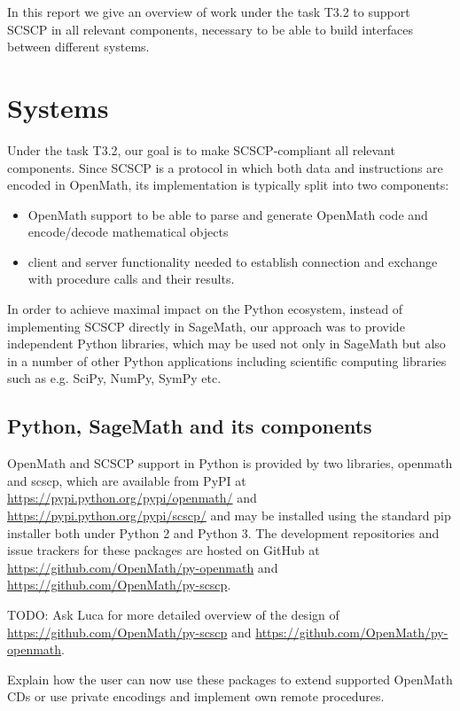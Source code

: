 \documentclass{deliverablereport}
\begin{document}
In this report we give an overview of work under the task T3.2 
to support SCSCP in all relevant components, necessary to be able
to build interfaces between different systems. 


\section{Systems}\label{systems}

Under the task T3.2, our goal is to make SCSCP-compliant all
relevant components. Since SCSCP is a protocol in which 
both data and instructions are encoded in OpenMath, its
implementation is typically split into two components: 
\begin{itemize}
\item OpenMath support to be able to parse and 
generate OpenMath code and encode/decode mathematical objects
\item client and server functionality needed to establish connection
and exchange with procedure calls and their results.
\end{itemize}

In order to achieve maximal impact on the Python ecosystem, 
instead of implementing SCSCP directly in SageMath, our approach
was to provide independent Python libraries, which may be used not
only in SageMath but also in a number of other Python applications
including scientific computing libraries such as e.g. 
SciPy, NumPy, SymPy etc.



\subsection{Python, SageMath and its components}

OpenMath and SCSCP support in Python is provided by two libraries, 
{\sf openmath} and {\sf scscp}, which are available from PyPI at
\url{https://pypi.python.org/pypi/openmath/} and
\url{https://pypi.python.org/pypi/scscp/} and
may be installed using the standard {\sf pip} installer 
both under Python 2 and Python 3. The development repositories
and issue trackers for these packages are hosted on GitHub
at \url{https://github.com/OpenMath/py-openmath}
and \url{https://github.com/OpenMath/py-scscp}.

TODO: Ask Luca for more detailed overview of the design of 
\url{https://github.com/OpenMath/py-scscp} 
and \url{https://github.com/OpenMath/py-openmath}. 

Explain how the user can now use these packages to extend supported OpenMath CDs
or use private encodings and implement own remote procedures.
\end{document}
